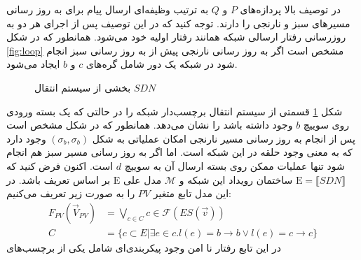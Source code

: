\documentclass[
msc,
irfonts
]{./tex/tehran-thesis}
\newcommand{\پ}{پروژه/پایان‌نامه/رساله }
\theoremstyle{definition}
\theoremstyle{theorem}
\theoremstyle{definition}
\numberwithin{algorithm}{chapter}
\newcommand{\s}[1]{\{#1\}}
\newcommand{\sem}[1]{\llbracket #1 \rrbracket}
\newcommand{\his}[1]{\langle #1 \rangle}
\newcommand{\ra}{\rightarrow}
\newcommand{\mc}[1]{\mathcal{#1}}
\newcommand{\mr}[1]{\mathrm{#1}}
\newcommand{\f}[1]{F_{#1}(\vec V_{#1})}
\begin{document}
در توصیف بالا پردازه‌های
$P$
و
$Q$
به ترتیب وظیفه‌ای ارسال پیام برای به روز رسانی مسیر‌های سبز و نارنجی را دارند.
توجه کنید که در این توصیف پس از اجرای هر دو به روزرسانی رفتار ارسالی شبکه همانند رفتار اولیه خود می‌شود.
همانطور که در شکل
\ref{fig:loop}
مشخص است اگر به روز رسانی نارنجی پیش از به روز رسانی سبز انجام شود در شبکه یک دور شامل گره‌های
$c$
و
$b$
ایجاد می‌شود.
\begin{figure}
    \centering
    \caption{
        بخشی از سیستم انتقال 
        $SDN$
    }
    \label{fig:loop:lts}
\end{figure}
شکل
\ref{fig:loop:lts}
قسمتی از سیستم انتقال برچسب‌دار شبکه را در حالتی که یک بسته ورودی روی سوییچ
$b$
وجود داشته باشد را نشان می‌دهد.
همانطور که در شکل مشخص است پس از انجام به روز رسانی مسیر نارنجی امکان عملیاتی به شکل
$(\sigma_b,\sigma_b)$
وجود دارد که به معنی وجود حلقه در این شبکه است.
اما اگر به روز رسانی مسیر سبز هم انجام شود تنها عملیات ممکن روی بسته ارسال آن به سوییچ
$d$
است.
اکنون فرض کنید که
$\mr{E} = \sem{SDN}$
ساختمان رویداد این شبکه و
$\mc{M}$
مدل علی
$\mr{E}$
بر اساس تعریف
باشد.
در این مدل تابع متغیر
$PV$
را به صورت زیر تعریف می‌کنیم:
\begin{align*}
    \f{PV} & = \bigvee_{c \in C} c \in \mathcal{F}(ES(\vec v)) \\
    C      & = \s{c \subset E | \exists e \in c.
        l(e) = b\ra b \vee l(e) = c\ra c }
\end{align*}
در این تابع رفتار نا امن وجود پیکربندی‌ای شامل یکی از برچسب‌های
\end{document}
